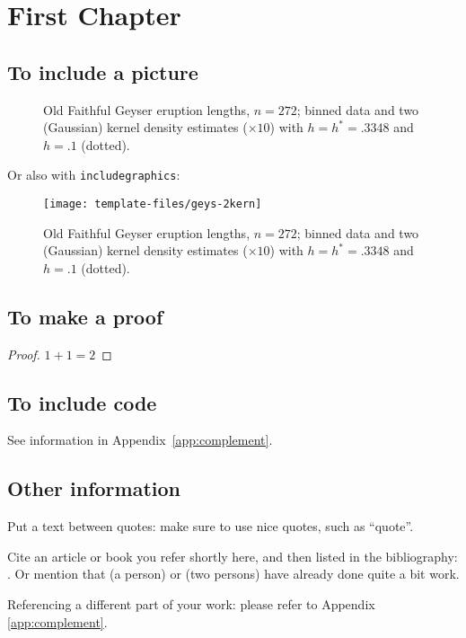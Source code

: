 \chapter{First Chapter}

\section{To include a picture}
\begin{figure}[hbt!]%
  \caption[Geyser data: binned histogram, Silverman's and another
    kernel]%
  {Old Faithful Geyser eruption lengths, $n=272$; binned data and two
    (Gaussian) kernel density estimates ($\times 10$) with $h=h^*= .3348$
    and $h= .1$ (dotted).}%
  \label{fig:geys1}
\end{figure}

Or also with \texttt{includegraphics}:
\begin{figure}[hbt!]%
  \centering
  \texttt{[image: template-files/geys-2kern]} %
  \caption[Geyser data: binned histogram, Silverman's and another
    kernel]%
  {Old Faithful Geyser eruption lengths, $n=272$; binned data and two
    (Gaussian) kernel density estimates ($\times 10$) with $h=h^*= .3348$
    and $h= .1$ (dotted).}%
  \label{fig:geys2}
\end{figure}

\section{To make a proof}
\begin{proof}
  $1 + 1 = 2$
\end{proof}

\section{To include \Rp code}
See information in Appendix~\ref{app:complement}.


\section{Other information}
Put a text between quotes: make sure to use nice quotes, such as ``quote''.

Cite an article or book you refer shortly here, and then listed in the bibliography: \cite{ReferenceKey}.
Or mention that \citeauthor{HamF85} (a person) or \citeauthor{StaWW91} (two
persons) have already done quite a bit work.

Referencing a different part of your work: please refer to Appendix \ref{app:complement}.


